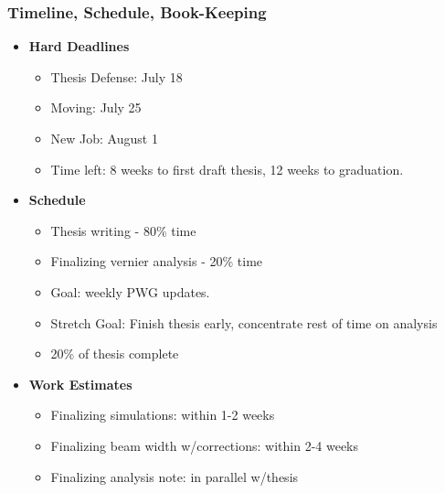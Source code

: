 \begin{frame}
  \frametitle{Timeline, Schedule, Book-Keeping}
  \begin{itemize}
    \item {\textbf{Hard Deadlines}}
      \begin{itemize}
        \item Thesis Defense: July 18
        \item Moving: July 25
        \item New Job: August 1
        \item Time left: 8 weeks to first draft thesis, 12 weeks to graduation.
      \end{itemize}
    \item{\textbf{Schedule}}
      \begin{itemize}
        \item Thesis writing - 80\% time
        \item Finalizing vernier analysis - 20\% time
        \item Goal: weekly PWG updates.
        \item Stretch Goal: Finish thesis early, concentrate rest of time on
          analysis
        \item 20\% of thesis complete
      \end{itemize}
    \item{\textbf{Work Estimates}}
      \begin{itemize}
        \item Finalizing simulations: within 1-2 weeks
        \item Finalizing beam width w/corrections: within 2-4 weeks
        \item Finalizing analysis note: in parallel w/thesis
      \end{itemize}
  \end{itemize}
\end{frame}
